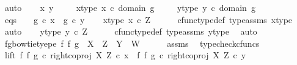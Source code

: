 \begin{isabellebody}
\ auto\isanewline
{}\isamarkupfalse%
\isanewline
\ \ \isamarkupfalse%
\ x\ y\ \isanewline
\ \ \isamarkupfalse%
\ x{\isacharunderscore}{\kern0pt}type{\isacharcolon}{\kern0pt}\ {\isachardoublequoteopen}x\ {\isasymin}\isactrlsub c\ domain\ g{\isachardoublequoteclose}\ \isanewline
\ \ \isamarkupfalse%
\ y{\isacharunderscore}{\kern0pt}type{\isacharcolon}{\kern0pt}\ {\isachardoublequoteopen}y\ {\isasymin}\isactrlsub c\ domain\ g{\isachardoublequoteclose}\isanewline
\ \ \isamarkupfalse%
\ eqs{\isacharcolon}{\kern0pt}\ \ \ \ {\isachardoublequoteopen}g\ {\isasymcirc}\isactrlsub c\ x\ {\isacharequal}{\kern0pt}\ g\ {\isasymcirc}\isactrlsub c\ y{\isachardoublequoteclose}\isanewline
\isanewline
\ \ \isamarkupfalse%
\ x{\isacharunderscore}{\kern0pt}type{}{\isacharcolon}{\kern0pt}\ {\isachardoublequoteopen}x\ {\isasymin}\isactrlsub c\ Z{\isachardoublequoteclose}\isanewline
\ \ \ \ \isamarkupfalse%
\ cfunc{\isacharunderscore}{\kern0pt}type{\isacharunderscore}{\kern0pt}def\ type{\isacharunderscore}{\kern0pt}assms{\isacharparenleft}{\kern0pt}{}{\isacharparenright}{\kern0pt}\ x{\isacharunderscore}{\kern0pt}type\ \isamarkupfalse%
\ auto\isanewline
\ \ \isamarkupfalse%
\ y{\isacharunderscore}{\kern0pt}type{}{\isacharcolon}{\kern0pt}\ {\isachardoublequoteopen}y\ {\isasymin}\isactrlsub c\ Z{\isachardoublequoteclose}\isanewline
\ \ \ \ \isamarkupfalse%
\ cfunc{\isacharunderscore}{\kern0pt}type{\isacharunderscore}{\kern0pt}def\ type{\isacharunderscore}{\kern0pt}assms{\isacharparenleft}{\kern0pt}{}{\isacharparenright}{\kern0pt}\ y{\isacharunderscore}{\kern0pt}type\ \isamarkupfalse%
\ auto\isanewline
\ \ \isamarkupfalse%
\ fg{\isacharunderscore}{\kern0pt}bowtie{\isacharunderscore}{\kern0pt}tyepe{\isacharcolon}{\kern0pt}\ {\isachardoublequoteopen}f\ {\isasymbowtie}\isactrlsub f\ g\ {\isacharcolon}{\kern0pt}\ X\ {\isasymCoprod}\ Z\ {\isasymrightarrow}\ Y\ {\isasymCoprod}\ W{\isachardoublequoteclose}\isanewline
\ \ \ \ \isamarkupfalse%
\ assms\ \isamarkupfalse%
\ typecheck{\isacharunderscore}{\kern0pt}cfuncs\isanewline
\ \ \isamarkupfalse%
\ lift{\isacharcolon}{\kern0pt}\ {\isachardoublequoteopen}{\isacharparenleft}{\kern0pt}f\ {\isasymbowtie}\isactrlsub f\ g{\isacharparenright}{\kern0pt}\ {\isasymcirc}\isactrlsub c\ right{\isacharunderscore}{\kern0pt}coproj\ X\ Z\ {\isasymcirc}\isactrlsub c\ x\ {\isacharequal}{\kern0pt}\ {\isacharparenleft}{\kern0pt}f\ {\isasymbowtie}\isactrlsub f\ g{\isacharparenright}{\kern0pt}\ {\isasymcirc}\isactrlsub c\ right{\isacharunderscore}{\kern0pt}coproj\ X\ Z\ {\isasymcirc}\isactrlsub c\ y{\isachardoublequoteclose}\isanewline

\end{isabellebody}
